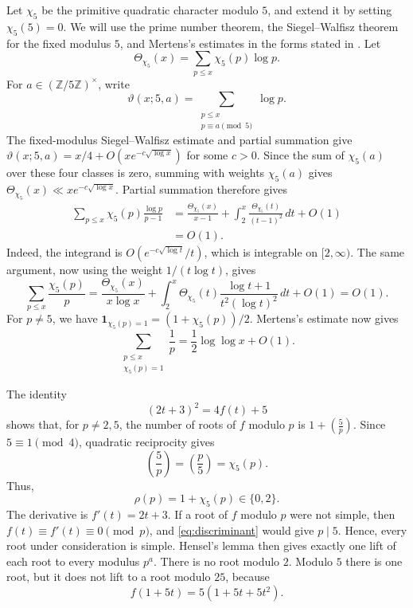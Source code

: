 \documentclass[11pt]{amsart}
\theoremstyle{definition}
\theoremstyle{remark}
\begin{document}
Let $\chi_5$ be the primitive quadratic character modulo $5$, and extend it
by setting $\chi_5(5)=0$.  We will use the prime number theorem, the
Siegel--Walfisz theorem for the fixed modulus $5$, and Mertens's estimates in
the forms stated in
\cite[Theorems 3.4, 8.1 and 12.1]{Koukoulopoulos}.  Let
\[
\Theta_{\chi_5}(x)=\sum_{p\leq x}\chi_5(p)\log p.
\]
For $a\in(\mathbb Z/5\mathbb Z)^\times$, write
\[
\vartheta(x;5,a)=\sum_{\substack{p\leq x\\ p\equiv a\pmod 5}}\log p.
\]
The fixed-modulus Siegel--Walfisz estimate and partial summation give
$\vartheta(x;5,a)=x/4+O(xe^{-c\sqrt{\log x}})$ for some $c>0$.  Since the
sum of $\chi_5(a)$ over these four classes is zero, summing with weights
$\chi_5(a)$ gives
$\Theta_{\chi_5}(x)\ll xe^{-c\sqrt{\log x}}$.
Partial summation therefore gives
\begin{equation}\label{eq:chi}
\begin{aligned}
\sum_{p\leq x}\chi_5(p)\frac{\log p}{p-1}
&=\frac{\Theta_{\chi_5}(x)}{x-1}
 +\int_2^x\frac{\Theta_{\chi_5}(t)}{(t-1)^2}\,dt+O(1)\\
&=O(1).
\end{aligned}
\end{equation}
Indeed, the integrand is $O(e^{-c\sqrt{\log t}}/t)$, which is integrable on
$[2,\infty)$.  The same argument, now using the weight $1/(t\log t)$,
gives
\[
\sum_{p\leq x}\frac{\chi_5(p)}p
=\frac{\Theta_{\chi_5}(x)}{x\log x}
 +\int_2^x\Theta_{\chi_5}(t)
 \frac{\log t+1}{t^2(\log t)^2}\,dt+O(1)
=O(1).
\]
For $p\neq5$, we have
$\mathbf 1_{\chi_5(p)=1}=(1+\chi_5(p))/2$.  Mertens's estimate now gives
\begin{equation}\label{eq:split}
\sum_{\substack{p\leq x\\ \chi_5(p)=1}}\frac1p
=\frac12\log\log x+O(1).
\end{equation}

The identity
\begin{equation}\label{eq:discriminant}
(2t+3)^2=4f(t)+5
\end{equation}
shows that, for $p\neq2,5$, the number of roots of $f$ modulo $p$ is
$1+\left(\frac5p\right)$.  Since $5\equiv1\pmod4$, quadratic reciprocity
gives
\[
\left(\frac5p\right)=\left(\frac p5\right)=\chi_5(p).
\]
Thus,
\begin{equation}\label{eq:rho}
\rho(p)=1+\chi_5(p)\in\{0,2\}.
\end{equation}
The derivative is $f'(t)=2t+3$.  If a root of $f$ modulo $p$ were not simple,
then $f(t)\equiv f'(t)\equiv0\pmod p$, and \eqref{eq:discriminant} would give
$p\mid5$.  Hence, every root under consideration is simple.  Hensel's lemma
then gives exactly one lift of each root to every modulus $p^a$.  There is no
root modulo $2$.  Modulo $5$ there is one root, but it does not lift to a root
modulo $25$, because
\begin{equation}\label{eq:five}
f(1+5t)=5(1+5t+5t^2).
\end{equation}
\end{document}
